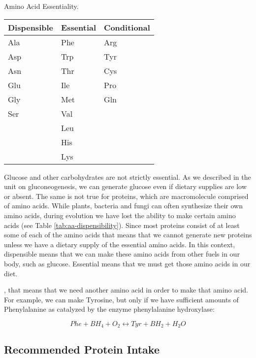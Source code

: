 \documentclass{tufte-handout}
\begin{document}
\begin{margintable}
\centering
\caption{Amino Acid Essentiality.}
\label{tab:aa-dispensibility}
\begin{tabular}{lll}
\hline
\textbf {Dispensible} & \textbf{Essential} & \textbf{Conditional}\\
\hline
Ala & Phe & Arg\\
Asp & Trp & Tyr\\
Asn & Thr & Cys\\
Glu & Ile & Pro\\
Gly & Met & Gln\\
Ser & Val\\
 & Leu\\
 & His\\
 & Lys\\
\hline
\end{tabular}
\end{margintable}

Glucose and other carbohydrates are not strictly essential.  As we described in the unit on gluconeogenesis, we can generate glucose even if dietary supplies are low or absent.  The same is not true for proteins, which are macromolecule comprised of amino acids.  While plants, bacteria and fungi can often synthesize their own amino acids, during evolution we have lost the ability to make certain amino acids (see Table \ref{tab:aa-dispensibility}).  Since most proteins consist of at least some of each of the amino acids that means that we cannot generate new proteins unless we have a dietary supply of the essential amino acids.  In this context, dispensible means that we can make these amino acids from other fuels in our body, such as glucose.  Essential means that we must get those amino acids in our diet.  

, that means that we need another amino acid in order to make that amino acid.  For example, we can make Tyrosine, but only if we have sufficient amounts of Phenylalanine as catalyzed by the enzyme phenylalanine hydroxylase:

\begin{equation}
Phe + BH_4 + O_2\leftrightarrow Tyr + BH_2 + H_2O 
\end{equation}

\subsection{Recommended Protein Intake}
\end{document}

